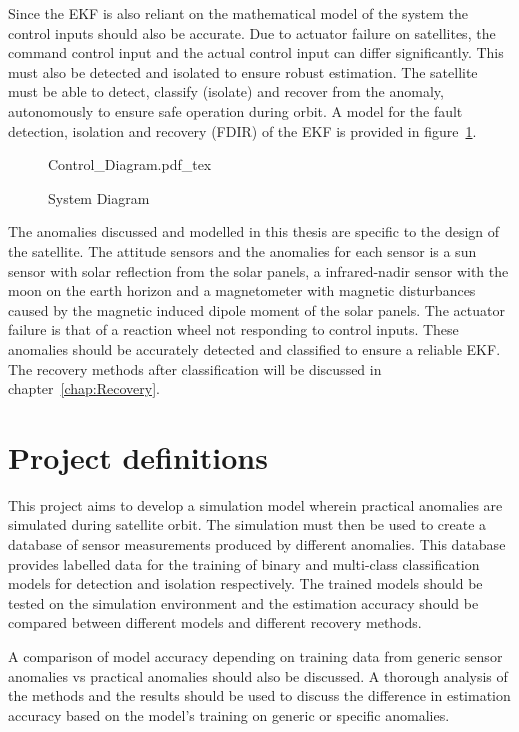 Since the EKF is also reliant on the mathematical model of the system the control inputs should also be accurate. Due to actuator failure on satellites, the command control input and the actual control input can differ significantly. This must also be detected and isolated to ensure robust estimation. The satellite must be able to detect, classify (isolate) and recover from the anomaly, autonomously to ensure safe operation during orbit. A model for the fault detection, isolation and recovery (FDIR) of the EKF is provided in figure~\ref{fig:System_Diagram}.

\begin{figure}[h!b!t]
	\centering
	\def\svgwidth{14cm}
	{Control_Diagram.pdf_tex}
	\caption{System Diagram}
	\label{fig:System_Diagram}
\end{figure}

The anomalies discussed and modelled in this thesis are specific to the design of the satellite. The attitude sensors and the anomalies for each sensor is a sun sensor with solar reflection from the solar panels, a infrared-nadir sensor with the moon on the earth horizon and a magnetometer with magnetic disturbances caused by the magnetic induced dipole moment of the solar panels. The actuator failure is that of a reaction wheel not responding to control inputs. These anomalies should be accurately detected and classified to ensure a reliable EKF. The recovery methods after classification will be discussed in chapter~\ref{chap:Recovery}.

\section{Project definitions}
This project aims to develop a simulation model wherein practical anomalies are simulated during satellite orbit. The simulation must then be used to create a database of sensor measurements produced by different anomalies. This database provides labelled data for the training of binary and multi-class classification models for detection and isolation respectively. The trained models should be tested on the simulation environment and the estimation accuracy should be compared between different models and different recovery methods.

A comparison of model accuracy depending on training data from generic sensor anomalies vs practical anomalies should also be discussed. A thorough analysis of the methods and the results should be used to discuss the difference in estimation accuracy based on the model's training on generic or specific anomalies. 

